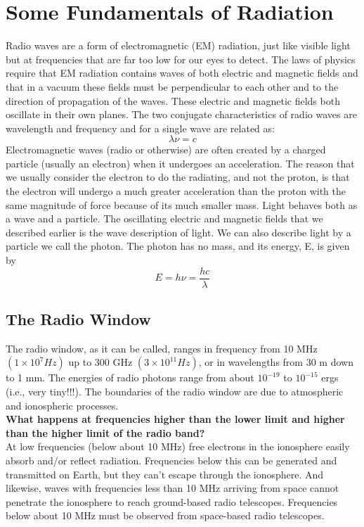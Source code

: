 \documentclass[10pt]{report}
\begin{document}
\section{Some Fundamentals of Radiation}
Radio waves are a form of electromagnetic (EM) radiation, just like visible light but at frequencies that are far too low for our eyes to detect.  The laws of physics require that EM radiation contains waves of both electric and magnetic fields and that in a vacuum these fields must be perpendicular to each other and to the direction of propagation of the waves. These electric and magnetic fields both oscillate in their own planes.
The two conjugate characteristics of radio waves are wavelength and frequency and for a single wave are related as:
\begin{equation}
\lambda \nu=c
\end{equation} 
Electromagnetic waves (radio or otherwise) are often created by a charged particle (usually an electron) when it undergoes an acceleration.  The reason that we usually consider the electron to do the radiating, and not the proton, is that the electron will undergo a much greater acceleration than the proton with the same magnitude of force because of its much smaller mass.  Light behaves both as a wave and a particle.  The oscillating electric and magnetic fields that we described earlier is the wave description of light.  We can also describe light by a particle we call the photon.  The photon has no mass, and its energy, E, is given by
\begin{equation}
E=h \nu =\frac{hc}{\lambda}
\end{equation}
\subsection{The Radio Window}
 The radio window, as it can be called, ranges in frequency from 10 MHz $(1\times 10^7 Hz)$ up to 300 GHz $(3\times 10^{11} Hz)$, or in wavelengths from 30 m down to 1 mm.  The energies of radio photons range from about $10^{-19}$ to $10^{-15}$ ergs (i.e., very tiny!!!).  The boundaries of the radio window are due to atmospheric and ionospheric processes.\\
\textbf{What happens at frequencies higher than the lower limit and higher than the higher limit of the radio band?}\\
At low frequencies (below about 10 MHz) free electrons in the ionosphere easily absorb and/or reflect radiation.  Frequencies below this can be generated and transmitted on Earth, but they can't escape through  the ionosphere. And likewise, waves with frequencies less than 10 MHz arriving from space cannot penetrate the ionosphere to reach ground-based radio telescopes.  Frequencies below about 10 MHz must be observed from space-based radio telescopes.  
 
\end{document}
